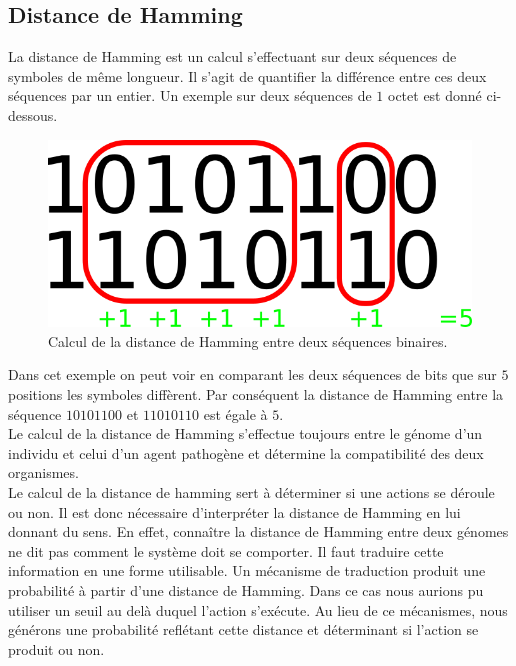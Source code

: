 \subsection{Distance de Hamming}

La distance de Hamming est un calcul s'effectuant sur deux séquences de symboles de même longueur. Il s'agit de quantifier la différence entre ces deux séquences par un entier. Un exemple sur deux séquences de $1$ octet est donné ci-dessous.

\begin{figure}[h]
	\centering
	\captionsetup{justification=centering}
	\includegraphics[scale=1]{Images/hamming.png}
	\caption[Calcul de la distance de Hamming]{Calcul de la distance de Hamming entre deux séquences binaires.}
\end{figure}

Dans cet exemple on peut voir en comparant les deux séquences de bits que sur $5$ positions les symboles diffèrent. Par conséquent la distance de Hamming entre la séquence $10101100$ et $11010110$ est égale à $5$.\\

Le calcul de la distance de Hamming s'effectue toujours entre le génome d'un individu et celui d'un agent pathogène et détermine la compatibilité des deux organismes.\\

Le calcul de la distance de hamming sert à déterminer si une actions se déroule ou non. Il est donc nécessaire d'interpréter la distance de Hamming en lui donnant du sens. En effet, connaître la distance de Hamming entre deux génomes ne dit pas comment le système doit se comporter. Il faut traduire cette information en une forme utilisable. Un mécanisme de traduction produit une probabilité à partir d'une distance de Hamming. Dans ce cas nous aurions pu utiliser un seuil au delà duquel l'action s'exécute. Au lieu de ce mécanismes, nous générons une probabilité reflétant cette distance et déterminant si l'action se produit ou non.\\

